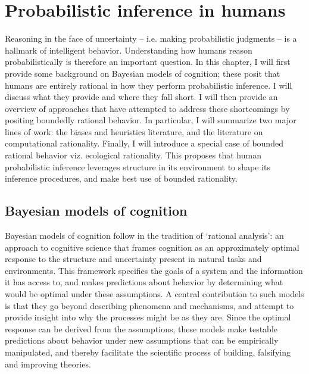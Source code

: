 

\chapter{Probabilistic inference in humans}
\label{chap:psych}

Reasoning in the face of uncertainty -- i.e. making probabilistic judgments -- is a hallmark of intelligent behavior. Understanding how humans reason probabilistically is therefore an important question. In this chapter, I will first provide some background on Bayesian models of cognition; these posit that humans are entirely rational in how they perform probabilistic inference. I will discuss what they provide and where they fall short. I will then provide an overview of approaches that have attempted to address these shortcomings by positing boundedly rational behavior. In particular, I will summarize two major lines of work: the biases and heuristics literature, and the literature on computational rationality. Finally, I will introduce a special case of bounded rational behavior viz. ecological rationality. This proposes that human probabilistic inference leverages structure in its environment to shape its inference procedures, and make best use of bounded rationality.

\section{Bayesian models of cognition}
Bayesian models of cognition follow in the tradition of `rational analysis'\cite{shepard1987toward, anderson1990adaptive}: an approach to cognitive science that frames cognition as an approximately optimal response to the structure and uncertainty present in natural tasks and environments. This framework specifies the goals of a system and the information it has access to, and makes predictions about behavior by determining what would be optimal under these assumptions. A central contribution to such models is that they go beyond describing phenomena and mechanisms, and attempt to provide insight into why the processes might be as they are. Since the optimal response can be derived from the assumptions, these models make testable predictions about behavior under new assumptions that can be empirically manipulated, and thereby facilitate the scientific process of building, falsifying and improving theories.

